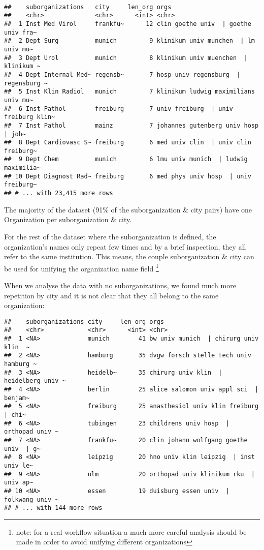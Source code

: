 \documentclass[]{article}
\let\rmarkdownfootnote\footnote%
\def\footnote{\protect\rmarkdownfootnote}
\begin{document}
\begin{verbatim}

##    suborganizations   city     len_org orgs                                
##    <chr>              <chr>      <int> <chr>                               
##  1 Inst Med Virol     frankfu~      12 clin goethe univ  | goethe univ fra~
##  2 Dept Surg          munich         9 klinikum univ munchen  | lm univ mu~
##  3 Dept Urol          munich         8 klinikum univ muenchen  | klinikum ~
##  4 Dept Internal Med~ regensb~       7 hosp univ regensburg  | regensburg ~
##  5 Inst Klin Radiol   munich         7 klinikum ludwig maximilians univ mu~
##  6 Inst Pathol        freiburg       7 univ freiburg  | univ freiburg klin~
##  7 Inst Pathol        mainz          7 johannes gutenberg univ hosp  | joh~
##  8 Dept Cardiovasc S~ freiburg       6 med univ clin  | univ clin freiburg~
##  9 Dept Chem          munich         6 lmu univ munich  | ludwig maximilia~
## 10 Dept Diagnost Rad~ freiburg       6 med phys univ hosp  | univ freiburg~
## # ... with 23,415 more rows
\end{verbatim}


The majority of the dataset (91\% of the suborganization \& city
pairs) have one Organization per suborganization \& city.

For the rest of the dataset where the suborganization is defined, the
organization's names only repeat few times and by a brief inspection,
they all refer to the same institution. This means, the couple
suborganization \& city can be used for unifying the organization name
field \footnote{note: for a real workflow situation a much more careful
  analysis should be made in order to avoid unifying different
  organizations}


When we analyse the data with no suborganizations, we found much more
repetition by city and it is not clear that they all belong to the same
organization:


\begin{verbatim}
##    suborganizations city     len_org orgs                                  
##    <chr>            <chr>      <int> <chr>                                 
##  1 <NA>             munich        41 bw univ munich  | chirurg univ klin  ~
##  2 <NA>             hamburg       35 dvgw forsch stelle tech univ hamburg ~
##  3 <NA>             heidelb~      35 chirurg univ klin  | heidelberg univ ~
##  4 <NA>             berlin        25 alice salomon univ appl sci  | benjam~
##  5 <NA>             freiburg      25 anasthesiol univ klin freiburg  | chi~
##  6 <NA>             tubingen      23 childrens univ hosp  | orthopad univ ~
##  7 <NA>             frankfu~      20 clin johann wolfgang goethe univ  | g~
##  8 <NA>             leipzig       20 hno univ klin leipzig  | inst univ le~
##  9 <NA>             ulm           20 orthopad univ klinikum rku  | univ ap~
## 10 <NA>             essen         19 duisburg essen univ  | folkwang univ ~
## # ... with 144 more rows
\end{verbatim}
\end{document}
